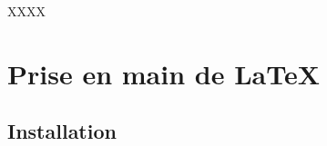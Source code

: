\documentclass[11pt,oneside,noprintercorrection]{ustl}
\begin{document}



\begin{ThesisAcknowledgments}




\end{ThesisAcknowledgments}



\WritePartLabelInToc \WriteChapterLabelInToc


\tableofcontents


\mainmatter




\NoChapterHead

XXXX


\chapter{Prise en main de \LaTeX}


\section{Installation}
\end{document}
